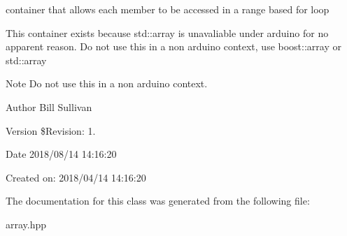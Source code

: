 container that allows each member to be accessed in a range based for loop 

This container exists because std\+::array is unavaliable under arduino for no apparent reason. Do not use this in a non arduino context, use boost\+::array or std\+::array

\begin{DoxyNote}{Note}
Do not use this in a non arduino context.
\end{DoxyNote}
\begin{DoxyAuthor}{Author}
Bill Sullivan
\end{DoxyAuthor}
\begin{DoxyVersion}{Version}
\$\+Revision\+: 1.
\end{DoxyVersion}
\begin{DoxyDate}{Date}
2018/08/14 14\+:16\+:20
\end{DoxyDate}
Created on\+: 2018/04/14 14\+:16\+:20 

The documentation for this class was generated from the following file\+:\begin{DoxyCompactItemize}
\item 
array.\+hpp\end{DoxyCompactItemize}
